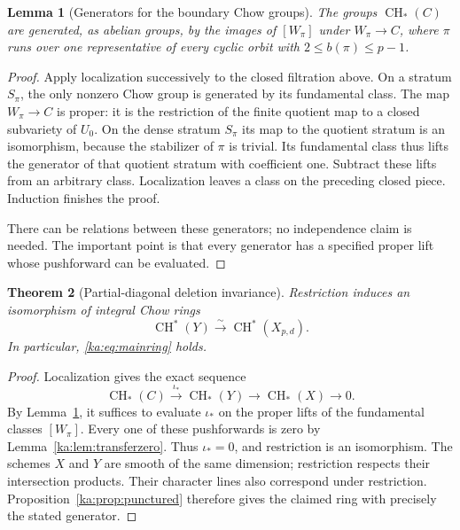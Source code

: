 \documentclass[11pt,a4paper]{article}
\newtheorem{theorem}{Theorem}[section]
\newtheorem{lemma}[theorem]{Lemma}
\theoremstyle{definition}
\theoremstyle{remark}
\newcommand{\CH}{\operatorname{CH}}
\begin{document}
\begin{lemma}[Generators for the boundary Chow groups]
\label{ka:lem:boundarygenerators}
The groups $\CH_*(C)$ are generated, as abelian groups, by the images
of $[W_\pi]$ under $W_\pi\to C$, where $\pi$ runs over one representative
of every cyclic orbit with $2\leq b(\pi)\leq p-1$.
\end{lemma}
\begin{proof}
Apply localization successively to the closed filtration above. On a
stratum $S_\pi$, the only nonzero Chow group is generated by its
fundamental class. The map $W_\pi\to C$ is proper: it is the
restriction of the finite quotient map to a closed subvariety of $U_0$.
On the dense stratum $S_\pi$ its map to the quotient stratum is an
isomorphism, because the stabilizer of $\pi$ is trivial. Its fundamental
class thus lifts the generator of that quotient stratum with coefficient
one. Subtract these lifts from an arbitrary class. Localization leaves
a class on the preceding closed piece. Induction finishes the proof.

There can be relations between these generators; no independence claim
is needed. The important point is that every generator has a specified
proper lift whose pushforward can be evaluated.
\end{proof}

\begin{theorem}[Partial-diagonal deletion invariance]
\label{ka:thm:deletion}
Restriction induces an isomorphism of integral Chow rings
\begin{equation}
 \CH^*(Y)\xrightarrow{\sim}\CH^*(X_{p,d}).
 \label{ka:eq:deletioniso}
\end{equation}
In particular, \eqref{ka:eq:mainring} holds.
\end{theorem}
\begin{proof}
Localization gives the exact sequence
\[
 \CH_*(C)\xrightarrow{\iota_*}\CH_*(Y)
      \longrightarrow\CH_*(X)\longrightarrow0.
\]
By Lemma~\ref{ka:lem:boundarygenerators}, it suffices to evaluate $\iota_*$
on the proper lifts of the fundamental classes $[W_\pi]$.
Every one of these pushforwards is zero by
Lemma~\ref{ka:lem:transferzero}. Thus $\iota_*=0$, and restriction is an
isomorphism. The schemes $X$ and $Y$ are smooth of the same dimension;
restriction respects their intersection products. Their character lines
also correspond under restriction. Proposition~\ref{ka:prop:punctured}
therefore gives the claimed ring with precisely the stated generator.
\end{proof}
\end{document}
